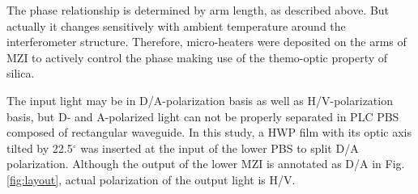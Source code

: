 \documentclass[letterpaper, 10pt]{article}
\begin{document}
The phase relationship is determined by arm length, as described above.
But actually it changes sensitively with ambient temperature around the interferometer structure.
Therefore, micro-heaters were deposited on the arms of MZI to actively control the phase making use of the themo-optic property of silica.

The input light may be in D/A-polarization basis as well as H/V-polarization basis, but D- and A-polarized light can not be properly separated in PLC PBS composed of rectangular waveguide.
In this study, a HWP film with its optic axis tilted by 22.5$^\circ$ was inserted at the input of the lower PBS to split D/A polarization.
Although the output of the lower MZI is annotated as D/A in Fig. \ref{fig:layout}, actual polarization of the output light is H/V.

\end{document}
